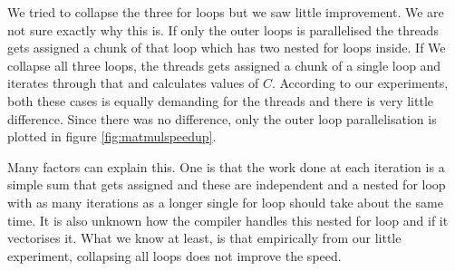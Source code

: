 We tried to collapse the three for loops but we saw little improvement. We are
not sure exactly why this is. If only the outer loops is parallelised the threads
gets assigned a chunk of that loop which has two nested for loops inside. If We
collapse all three loops, the threads gets assigned a chunk of a single loop and
iterates through that and calculates values of $C$. According to our experiments,
both these cases is equally demanding for the threads and there is very little
difference. Since there was no difference, only the outer loop parallelisation
is plotted in figure \ref{fig:matmulspeedup}.

Many factors can explain this. One is that the work done at each iteration
is a simple sum that gets assigned and these are independent and a nested for
loop with as many iterations as a longer single for loop should take about the
same time. It is also unknown how the compiler handles this nested for loop and
if it vectorises it. What we know at least, is that empirically from our little experiment, collapsing
all loops does not improve the speed.
